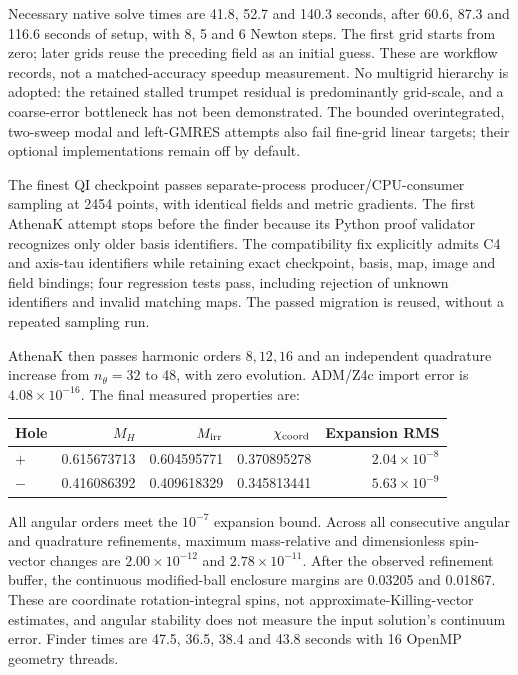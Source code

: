 \documentclass[aps,prd,preprint,notitlepage,nofootinbib]{revtex4-2}
\begin{document}
Necessary native solve times are 41.8, 52.7 and 140.3 seconds, after 60.6, 87.3
and 116.6 seconds of setup, with 8, 5 and 6 Newton steps. The first grid starts
from zero; later grids reuse the preceding field as an initial guess. These
are workflow records, not a matched-accuracy speedup measurement. No multigrid
hierarchy is adopted: the retained stalled trumpet residual is predominantly
grid-scale, and a coarse-error bottleneck has not been demonstrated.
The bounded overintegrated, two-sweep modal and left-GMRES attempts also fail
fine-grid linear targets; their optional implementations remain off by default.

The finest QI checkpoint passes separate-process producer/CPU-consumer
sampling at 2454 points, with identical fields and metric gradients. The first
AthenaK attempt stops before the finder because its Python proof validator
recognizes only older basis identifiers. The compatibility fix explicitly
admits C4 and axis-tau identifiers while retaining exact checkpoint, basis,
map, image and field bindings; four regression tests pass, including rejection
of unknown identifiers and invalid matching maps. The passed migration is
reused, without a repeated sampling run.

AthenaK then passes harmonic orders $8,12,16$ and an independent quadrature
increase from $n_\theta=32$ to 48, with zero evolution. ADM/Z4c import error is
$4.08\times10^{-16}$. The final measured properties are:
\begin{center}\footnotesize
\begin{tabular}{@{}lrrrr@{}}
\toprule
Hole & $M_H$ & $M_{\rm irr}$ & $\chi_{\rm coord}$ & Expansion RMS\\\midrule
$+$ &0.615673713 &0.604595771 &0.370895278 &$2.04\times10^{-8}$\\
$-$ &0.416086392 &0.409618329 &0.345813441 &$5.63\times10^{-9}$\\
\bottomrule
\end{tabular}
\end{center}
All angular orders meet the $10^{-7}$ expansion bound. Across all consecutive
angular and quadrature refinements, maximum mass-relative and dimensionless
spin-vector changes are $2.00\times10^{-12}$ and $2.78\times10^{-11}$. After the observed refinement buffer, the continuous
modified-ball enclosure margins are 0.03205 and 0.01867. These are coordinate
rotation-integral spins, not approximate-Killing-vector estimates, and angular
stability does not measure the input solution's continuum error. Finder times
are 47.5, 36.5, 38.4 and 43.8 seconds with 16 OpenMP geometry threads.
\end{document}

